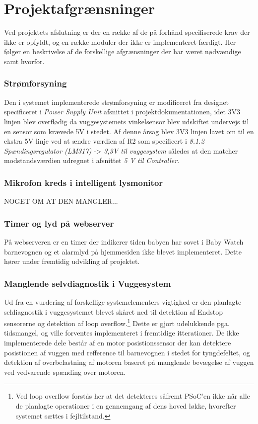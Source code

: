 %
\chapter{Projektafgrænsninger}
\label{projektafgraensninger}
Ved projektets afslutning er der en række af de på forhånd specifiserede krav der ikke er opfyldt, og en række moduler der ikke er implementeret færdigt. Her følger en beskrivelse af de forskellige afgrænsninger der har været nødvændige samt hvorfor. 

\subsection{Strømforsyning}
Den i systemet implementerede strømforsyning er modificeret fra designet specificeret i \textit{Power Supply Unit} afsnittet i projektdokumentationen, idet 3V3 linjen blev overflødig da vuggesystemets vinkelsensor blev udskiftet undervejs til en sensor som krævede 5V i stedet. Af denne årsag blev 3V3 linjen lavet om til en ekstra 5V linje ved at ændre værdien af R2 som specificert i \textit{8.1.2 Spændingsregulator (LM317)} -> \textit{3,3V til vuggesystem} således at den matcher modstandsværdien udregnet i afsnittet \textit{5 V til Controller}.

\subsection{Mikrofon kreds i intelligent lysmonitor}
NOGET OM AT DEN MANGLER...

\subsection{Timer og lyd på webserver}
På webserveren er en timer der indikerer tiden babyen har sovet i Baby Watch barnevognen og et alarmlyd på hjemmesiden ikke blevet implementeret. Dette hører under fremtidig udvikling af projektet. 

\subsection{Manglende selvdiagnostik i Vuggesystem}
Ud fra en vurdering af forskellige systemelementers vigtighed er den planlagte seldiagnostik i vuggesystemet blevet skåret ned til detektion af Endstop sensorerne og detektion af loop overflow.\footnote{Ved loop overflow forstås her at det detekteres såfremt PSoC'en ikke når alle de planlagte operationer i en gennemgang af dens hoved løkke, hvorefter systemet sættes i fejltilstand.} Dette er gjort udelukkende pga. tidsmangel, og ville forventes implementeret i fremtidige itterationer. De ikke implementerede dele består af en motor posistionssensor der kan detektere posistionen af vuggen med refference til barnevognen i stedet for tyngdefeltet, og detektion af overbelastning af motoren baseret på manglende bevægelse af vuggen ved vedvarende spænding over motoren. 

